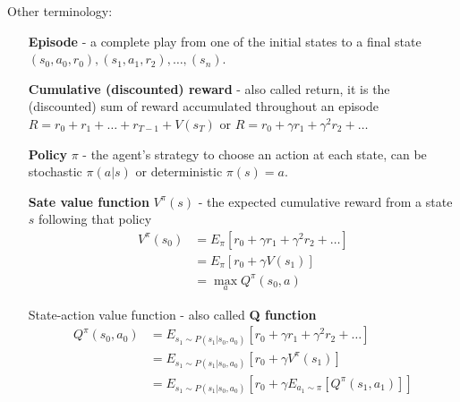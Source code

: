 \documentclass{tufte-handout}
\begin{document}
Other terminology:
\begin{itemize}
  \item[\textbf{Episode}] - a complete play from one of the initial states to a final state $(s_0,a_0,r_0), (s_1,a_1,r_2), \ldots, (s_n)$.

  \item[\textbf{Cumulative (discounted) reward}] - also called return, it is the (discounted) sum of reward accumulated throughout an episode $R = r_0 +  r_1 + \ldots + r_{T-1} + V(s_T) $ or  $R =  r_0 + \gamma r_1 + \gamma^2 r_2 + \ldots $
    \vspace{-10pt}

  \item[\textbf{Policy} $\pi$] - the agent's strategy to choose an action at each state, can be stochastic $\pi(a|s)$ or deterministic $\pi(s)=a$.

  \item[\textbf{Sate value function} $V^\pi(s)$] - the expected cumulative reward from a state $s$ following that policy
    \begin{align*}
    V^\pi(s_0) &= E_\pi [ r_0 + \gamma r_1 + \gamma^2 r_2 + \ldots ] \\
    &= E_\pi [ r_0 + \gamma V(s_{1}) ] \\
    &= \max_a Q^\pi(s_0,a)
    \end{align*}

  \item[State-action value function] - also called \textbf{Q function} 
    \begin{align*}
    Q^\pi(s_0,a_0) &= E_{s_1\sim P(s_1|s_0,a_0)} [ r_0 + \gamma r_{1} + \gamma^2 r_{2} + \ldots] \\
    &= E_{s_1\sim P(s_1|s_0,a_0)} [ r_0 + \gamma V^\pi(s_{1})] \\
    &= E_{s_1\sim P(s_1|s_0,a_0)} [ r_0 + \gamma E_{a_{1}\sim\pi} [Q^\pi(s_{1},a_{1})]] 
    \end{align*}
\end{itemize}
\end{document}
